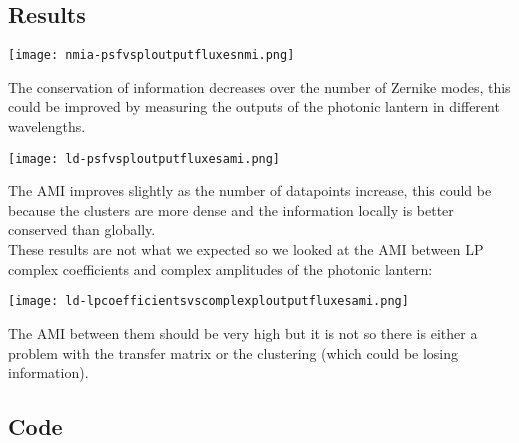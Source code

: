 	
	\subsection{Results}
		\begin{figure*}[ht!]
			\centering
			\texttt{[image: nmia-psfvsploutputfluxesnmi.png]}
		\end{figure*}
		\FloatBarrier
		
		The conservation of information decreases over the number of Zernike modes, this could be improved by measuring the outputs of the photonic lantern in different wavelengths.\\
		
		\begin{figure*}[ht!]
			\centering
			\texttt{[image: ld-psfvsploutputfluxesami.png]}
		\end{figure*}
		\FloatBarrier
		
		The AMI improves slightly as the number of datapoints increase, this could be because the clusters are more dense and the information locally is better conserved than globally.\\
		
		These results are not what we expected so we looked at the AMI between LP complex coefficients and complex amplitudes of the photonic lantern:
		
		\begin{figure*}[ht!]
			\centering
			\texttt{[image: ld-lpcoefficientsvscomplexploutputfluxesami.png]}
		\end{figure*}
		\FloatBarrier
		The AMI between them should be very high but it is not so there is either a problem with the transfer matrix or the clustering (which could be losing information).
		
	
	\subsection{Code}
	
